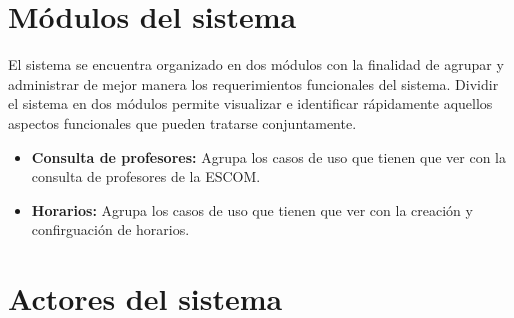 
\section{Módulos del sistema}

    El sistema se encuentra organizado en dos  módulos con la finalidad de agrupar y administrar de mejor manera los requerimientos funcionales del sistema. Dividir el sistema en dos módulos permite visualizar e identificar rápidamente aquellos aspectos funcionales que pueden tratarse conjuntamente. \\



    \begin{itemize}
	\item {\bf Consulta de profesores:} Agrupa los casos de uso que tienen que ver con la consulta de profesores de la ESCOM. 

	
	\item {\bf Horarios:} Agrupa los casos de uso que tienen que ver con la creación y confirguación de horarios.
%	
    \end{itemize}

\section{Actores del sistema}\label{sec:Comportamiento:ActoresSistema}

